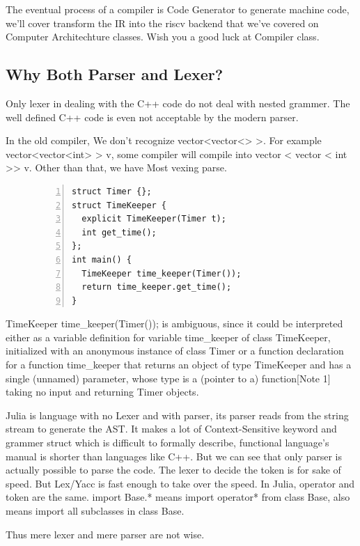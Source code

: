 \documentclass[a4paper]{article}
\theoremstyle{definition}
\begin{document}
The eventual process of a compiler is Code Generator to generate machine code, we'll cover transform the IR into the riscv backend that we've covered on Computer Architechture classes. Wish you a good luck at Compiler class.

\subsection{Why Both Parser and Lexer?}
Only lexer in dealing with the C++ code do not deal with nested grammer. The well defined C++ code is even not acceptable by the modern parser.

In the old compiler, We don't recognize vector<vector<> >. For example vector<vector<int> > v, some compiler will compile into vector < vector < int >> v. Other than that, we have Most vexing parse.

\begin{figure}[H]
    \begin{lstlisting}[language={[ANSI]C},
            numbers=left,
            numberstyle=\extratiny,
            basicstyle=\small]
struct Timer {};
struct TimeKeeper {
  explicit TimeKeeper(Timer t);
  int get_time();
};
int main() {
  TimeKeeper time_keeper(Timer());
  return time_keeper.get_time();
}
    \end{lstlisting}
\end{figure}

TimeKeeper time\_keeper(Timer()); is ambiguous, since it could be interpreted either as a variable definition for variable time\_keeper of class TimeKeeper, initialized with an anonymous instance of class Timer or a function declaration for a function time\_keeper that returns an object of type TimeKeeper and has a single (unnamed) parameter, whose type is a (pointer to a) function[Note 1] taking no input and returning Timer objects.

Julia is language with no Lexer and with parser, its parser reads from the string stream to generate the AST. It makes a lot of Context-Sensitive keyword and grammer struct which is difficult to formally describe, functional language's manual is shorter than languages like C++. But we can see that only parser is actually possible to parse the code. The lexer to decide the token is for sake of speed. But Lex/Yacc is fast enough to take over the speed. In Julia, operator and token are the same. import Base.* means import operator* from class Base, also means import all subclasses in class Base.

Thus mere lexer and mere parser are not wise.
\end{document}
